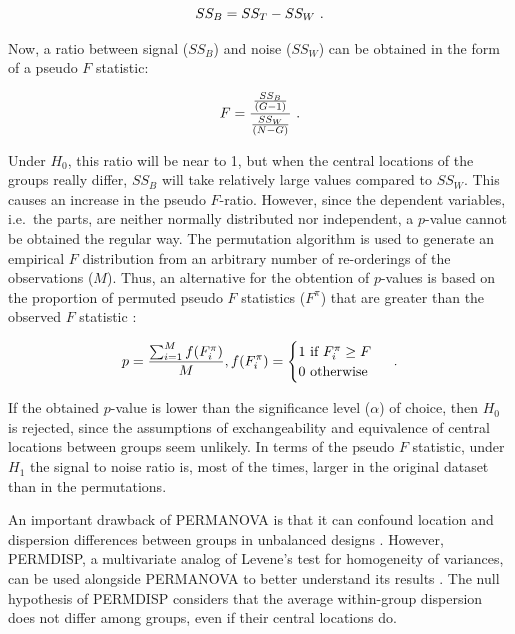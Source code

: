 \documentclass[
  openany]{book}
\begin{document}
\begin{equation} 
  SS_B = SS_T - SS_W \text{ .}\\
  \label{eq:SSB}
\end{equation}

Now, a ratio between signal (\(SS_B\)) and noise (\(SS_W\)) can be obtained in the form of a pseudo \(F\) statistic:

\begin{equation} 
  F = \frac{\frac{SS_B}{(G-1)}}{\frac{SS_W}{(N-G)}} \text{ .}\\
  \label{eq:pseudo-F}
\end{equation}

Under \(H_0\), this ratio will be near to 1, but when the central locations of the groups really differ, \(SS_B\) will take relatively large values compared to \(SS_W\). This causes an increase in the pseudo \(F\)-ratio. However, since the dependent variables, i.e.~the parts, are neither normally distributed nor independent, a \(p\)-value cannot be obtained the regular way. The permutation algorithm is used to generate an empirical \(F\) distribution from an arbitrary number of re-orderings of the observations (\(M\)). Thus, an alternative for the obtention of \(p\)-values is based on the proportion of permuted pseudo \(F\) statistics (\(F^\pi\)) that are greater than the observed \(F\) statistic \autocite{Anderson2001}:

\begin{equation} 
  p = \frac{\sum_{i=1}^M f(F_i^\pi)}{M}, f(F_i^\pi) = \begin{cases} 1 \text{ if } F_i^\pi \geq F \\ 0 \text{ otherwise} \end{cases}\text{ .}\\
  \label{eq:pval}
\end{equation}

If the obtained \(p\)-value is lower than the significance level (\(\alpha\)) of choice, then \(H_0\) is rejected, since the assumptions of exchangeability and equivalence of central locations between groups seem unlikely. In terms of the pseudo \(F\) statistic, under \(H_1\) the signal to noise ratio is, most of the times, larger in the original dataset than in the permutations.

An important drawback of PERMANOVA is that it can confound location and dispersion differences between groups in unbalanced designs \autocite{Anderson2001,Anderson2013}. However, PERMDISP, a multivariate analog of Levene's test for homogeneity of variances, can be used alongside PERMANOVA to better understand its results \autocite{Anderson2006}. The null hypothesis of PERMDISP considers that the average within-group dispersion does not differ among groups, even if their central locations do.
\end{document}
